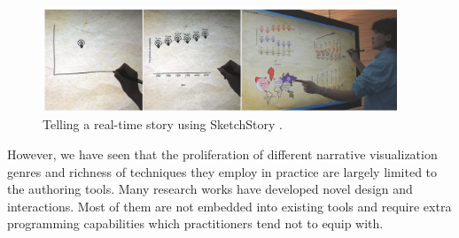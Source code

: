\begin{figure}[htb]
	\centering 
	\includegraphics[width=0.95\textwidth]{figure/SketchStory.png} 
	\caption{ Telling a real-time story using SketchStory \cite{Lee2013}. } 
	\label{sketchStory} 
\end{figure}

However, we have seen that the proliferation of different narrative visualization genres and richness of techniques they employ in practice are largely limited to the authoring tools. Many research works have developed novel design and interactions. Most of them are not embedded into existing tools and require extra programming capabilities which practitioners tend not to equip with. 


\newpage